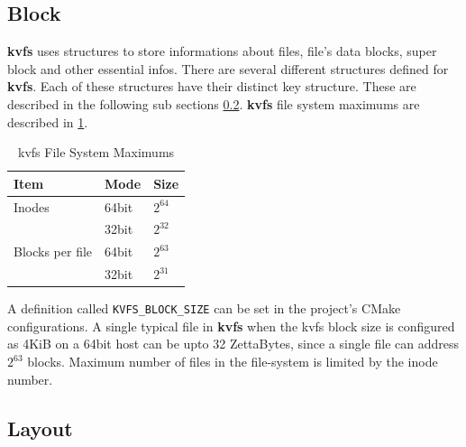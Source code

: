 \documentclass[bsc,frontabs,twoside,singlespacing,parskip,deptreport]{infthesis}     %
\begin{document}
{\subsection{Block}
{\bf kvfs} uses structures to store informations about files, file's data blocks, super block and other essential infos. There are several different structures defined for {\bf kvfs}. Each of these structures have their distinct key structure. These are described in the following sub sections \ref{structure_layouts}.
{\bf kvfs} file system maximums are described in \ref{tab:kvfs_fs_maximums}.
\begin{table}[h]
	\begin{center}
		\caption{kvfs File System Maximums}
		\label{tab:kvfs_fs_maximums}
		\begin{tabular}{l|l|l}
		   \hline
			\textbf{Item} & \textbf{Mode} & \textbf{Size} \\
			\hline
			Inodes & 64bit & $2^{64}$ \\
			& 32bit & $2^{32}$ \\
			\hline
			Blocks per file & 64bit & $2^{63}$ \\
			& 32bit & $2^{31}$ \\	
			\hline
		\end{tabular}
	\end{center}
\end{table}
A definition called {\tt KVFS\_BLOCK\_SIZE} can be set in the project's CMake configurations. 
A single typical file in {\bf kvfs} when the kvfs block size is configured as 4KiB on a 64bit host can be upto 32 ZettaBytes, since a single file can address $2^{63}$ blocks. 
Maximum number of files in the file-system is limited by the inode number.

\subsection{Layout} \label{structure_layouts}
}
\end{document}

